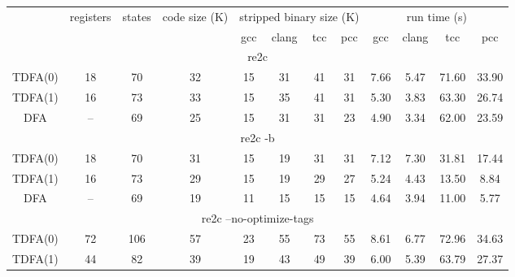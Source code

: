 \documentclass{article}
\newenvironment{Xtab}
    {\par\medskip\noindent\minipage{\linewidth}\begin{center}}
    {\end{center}\endminipage\par\medskip}
\theoremstyle{definition}
\begin{document}
\begin{Xtab}\label{table2}
\begin{center}
    \begin{tabular}{|c|ccccccccccc|}
    \hline
    & registers & states & code size (K) & \multicolumn{4}{c}{stripped binary size (K)} & \multicolumn{4}{c|}{run time (s)} \\
    & & &
        & gcc & clang & tcc & pcc
        & gcc & clang & tcc & pcc \\
    \hline \hline
    \multicolumn{12}{|c|}{re2c} \\
    \hline
    TDFA(0) & 18 & 70 & 32 & 15 & 31 & 41 & 31 & 7.66 & 5.47 & 71.60 & 33.90 \\
    TDFA(1) & 16 & 73 & 33 & 15 & 35 & 41 & 31 & 5.30 & 3.83 & 63.30 & 26.74 \\
    DFA     & -- & 69 & 25 & 15 & 31 & 31 & 23 & 4.90 & 3.34 & 62.00 & 23.59 \\
    \hline \hline
    \multicolumn{12}{|c|}{re2c -b} \\
    \hline
    TDFA(0) & 18 & 70 & 31 & 15 & 19 & 31 & 31 & 7.12 & 7.30 & 31.81 & 17.44 \\
    TDFA(1) & 16 & 73 & 29 & 15 & 19 & 29 & 27 & 5.24 & 4.43 & 13.50 &  8.84 \\
    DFA     & -- & 69 & 19 & 11 & 15 & 15 & 15 & 4.64 & 3.94 & 11.00 &  5.77 \\
    \hline \hline
    \multicolumn{12}{|c|}{re2c --no-optimize-tags} \\
    \hline
    TDFA(0) & 72 & 106 & 57 & 23 & 55 & 73 & 55 & 8.61 & 6.77 & 72.96 & 34.63 \\
    TDFA(1) & 44 &  82 & 39 & 19 & 43 & 49 & 39 & 6.00 & 5.39 & 63.79 & 27.37 \\
    \hline
    \end{tabular}
\end{center}
\end{Xtab}
\end{document}
